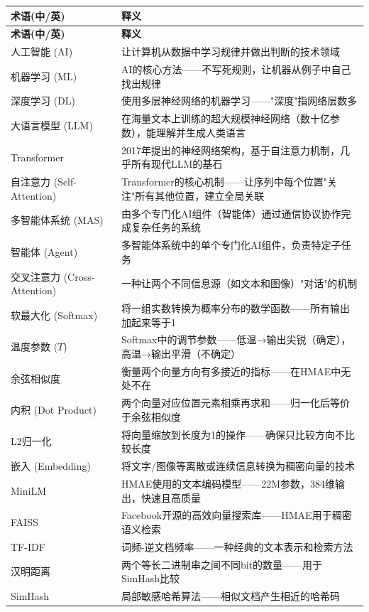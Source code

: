 \documentclass[11pt,a4paper]{ctexart}
\begin{document}
\small
\begin{longtable}{p{3.5cm}p{10.5cm}}
\toprule
\textbf{术语(中/英)} & \textbf{释义} \\
\midrule
\endfirsthead
\midrule
\textbf{术语(中/英)} & \textbf{释义} \\
\midrule
\endhead
\bottomrule
\endlastfoot

人工智能 (AI) & 让计算机从数据中学习规律并做出判断的技术领域 \\
机器学习 (ML) & AI的核心方法——不写死规则，让机器从例子中自己找出规律 \\
深度学习 (DL) & 使用多层神经网络的机器学习——"深度"指网络层数多 \\
大语言模型 (LLM) & 在海量文本上训练的超大规模神经网络（数十亿参数），能理解并生成人类语言 \\
Transformer & 2017年提出的神经网络架构，基于自注意力机制，几乎所有现代LLM的基石 \\
自注意力 (Self-Attention) & Transformer的核心机制——让序列中每个位置"关注"所有其他位置，建立全局关联 \\
多智能体系统 (MAS) & 由多个专门化AI组件（智能体）通过通信协议协作完成复杂任务的系统 \\
智能体 (Agent) & 多智能体系统中的单个专门化AI组件，负责特定子任务 \\
交叉注意力 (Cross-Attention) & 一种让两个不同信息源（如文本和图像）"对话"的机制 \\
软最大化 (Softmax) & 将一组实数转换为概率分布的数学函数——所有输出加起来等于1 \\
温度参数 ($T$) & Softmax中的调节参数——低温→输出尖锐（确定），高温→输出平滑（不确定） \\
余弦相似度 & 衡量两个向量方向有多接近的指标——在HMAE中无处不在 \\
内积 (Dot Product) & 两个向量对应位置元素相乘再求和——归一化后等价于余弦相似度 \\
L2归一化 & 将向量缩放到长度为1的操作——确保只比较方向不比较长度 \\
嵌入 (Embedding) & 将文字/图像等离散或连续信息转换为稠密向量的技术 \\
MiniLM & HMAE使用的文本编码模型——22M参数，384维输出，快速且高质量 \\
FAISS & Facebook开源的高效向量搜索库——HMAE用于稠密语义检索 \\
TF-IDF & 词频-逆文档频率——一种经典的文本表示和检索方法 \\
汉明距离 & 两个等长二进制串之间不同bit的数量——用于SimHash比较 \\
SimHash & 局部敏感哈希算法——相似文档产生相近的哈希码 \\

\end{longtable}
\end{document}
